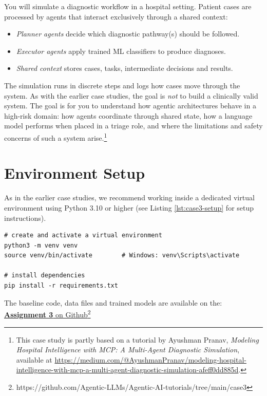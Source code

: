 You will simulate a diagnostic workflow in a hospital setting. Patient cases are processed by agents that interact exclusively through a shared context:
\begin{itemize}
    \item \textit{Planner agents} decide which diagnostic pathway(s) should be followed.
    \item \textit{Executor agents} apply trained ML classifiers to produce diagnoses.
    \item \textit{Shared context} stores cases, tasks, intermediate decisions and results.
\end{itemize}
The simulation runs in discrete steps and logs how cases move through the system. As with the earlier case studies, the goal is \emph{not} to build a clinically valid system. The goal is for you to understand how agentic architectures behave in a high-risk domain: how agents coordinate through shared state, how a language model performs when placed in a triage role, and where the limitations and safety concerns of such a system arise.\footnote{This case study is partly based on a tutorial by Ayushman Pranav, \emph{Modeling Hospital Intelligence with MCP: A Multi-Agent Diagnostic Simulation}, available at \url{https://medium.com/@AyushmanPranav/modeling-hospital-intelligence-with-mcp-a-multi-agent-diagnostic-simulation-afeff0dd885d}.}


\section{Environment Setup}
\label{sec:case3-setup}

As in the earlier case studies, we recommend working inside a dedicated virtual environment using Python 3.10 or higher (see Listing \ref{lst:case3-setup} for setup instructions).

\begin{listing}[!ht]
\begin{verbatim}
# create and activate a virtual environment
python3 -m venv venv
source venv/bin/activate        # Windows: venv\Scripts\activate

# install dependencies
pip install -r requirements.txt
\end{verbatim}
\caption{Setting Up the Case Study 3 Environment}
\label{lst:case3-setup}
\end{listing}

\begin{tcolorbox}[
    colback=blue!10!white,
    colframe=blue!85!black,
    title={\faRocket\quad View on Github!},
    fonttitle=\bfseries,
    coltitle=white,
    boxrule=1pt,
    arc=4pt,
    left=5pt,
    right=5pt,
    top=5pt,
    bottom=5pt,
    enhanced
]
The baseline code, data files and trained models are available on the:\\
\href{https://github.com/Agentic-LLMs/Agentic-AI-tutorials/tree/main/case3}{\faCode\quad \textbf{Assignment 3} on Github\footnote{https://github.com/Agentic-LLMs/Agentic-AI-tutorials/tree/main/case3}}
\end{tcolorbox}


